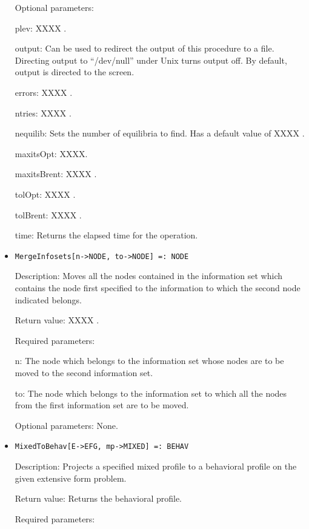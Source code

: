 \begin{itemize}
\item
[Optional parameters:]\hfil\null

\bd
\item
[ plev:]XXXX .
\item
[ output:] Can be used to redirect the output of this procedure to a
file.  Directing output to ``/dev/null'' under Unix turns output off.
By default, output is directed to the screen.
\item
[ errors:] XXXX .
\item
[ ntries:] XXXX .
\item
[ nequilib:] Sets the number of equilibria to find.  Has a default 
value of XXXX . 
\item
[ maxitsOpt:] XXXX.
\item
[ maxitsBrent:] XXXX .
\item
[ tolOpt:] XXXX . 
\item
[ tolBrent:] XXXX .
\item
[ time:] Returns the elapsed time for the operation.
\ed
\ed

\item
\protect \large \begin{verbatim}
MergeInfosets[n->NODE, to->NODE] =: NODE
\end{verbatim}\normalsize

\bd
\item
[Description:] Moves all the nodes contained in the information set 
which contains the node first specified to the information to which the
second node indicated belongs.
\item
[Return value:] XXXX .
\item
[Required parameters:]\hfil\null

\bd
\item
[ n:] The node which belongs to the information set whose nodes are
to be moved to the second information set.
\item
[ to:] The node which belongs to the information set to which all
the nodes from the first information set are to be moved.
\ed

\item
[Optional parameters:] None.
\ed

\item
\protect \large \begin{verbatim}
MixedToBehav[E->EFG, mp->MIXED] =: BEHAV
\end{verbatim}\normalsize

\bd
\item
[Description:] Projects a specified mixed profile to a behavioral 
profile on the given extensive form problem.
\item
[Return value:] Returns the behavioral profile.
\item
[Required parameters:]\hfil\null


\end{itemize}
